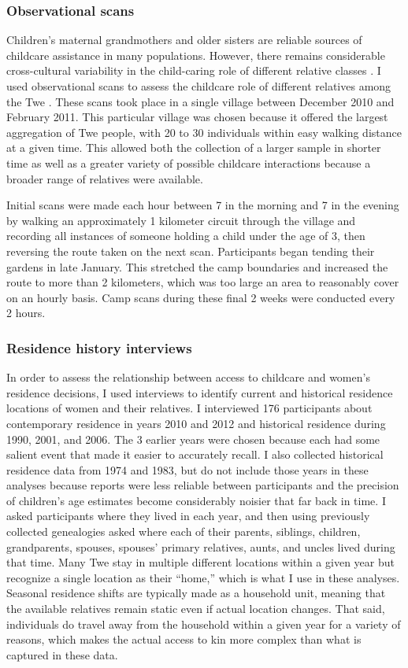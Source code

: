 \documentclass[10pt]{article}
\begin{document}
\subsubsection{Observational scans} 
Children's maternal grandmothers and older sisters are reliable sources of childcare assistance in many populations.  However, there remains considerable cross-cultural variability in the child-caring role of different relative classes \citep{hames2004women, kramer2010cooperative}.  I used observational scans to assess the childcare role of different relatives among the Twe \citep{crittenden2008allomaternal}.  These scans took place in a single village between December 2010 and February 2011.  This particular village was chosen because it offered the largest aggregation of Twe people, with 20 to 30 individuals within easy walking distance at a given time.  This allowed both the collection of a larger sample in shorter time as well as a greater variety of possible childcare interactions because a broader range of relatives were available.

Initial scans were made each hour between 7 in the morning and 7 in the evening by walking an approximately 1 kilometer circuit through the village and recording all instances of someone holding a child under the age of 3, then reversing the route taken on the next scan.  Participants began tending their gardens in late January.  This stretched the camp boundaries and increased the route to more than 2 kilometers, which was too large an area to reasonably cover on an hourly basis.  Camp scans during these final 2 weeks were conducted every 2 hours.

\subsubsection{Residence history interviews}  
In order to assess the relationship between access to childcare and women's residence decisions, I used interviews to identify current and historical residence locations of women and their relatives.  I interviewed 176 participants about contemporary residence in years 2010 and 2012 and historical residence during 1990, 2001, and 2006.  The 3 earlier years were chosen because each had some salient event that made it easier to accurately recall.  I also collected historical residence data from 1974 and 1983, but do not include those years in these analyses because reports were less reliable between participants and the precision of children's age estimates become considerably noisier that far back in time.  I asked participants where they lived in each year, and then using previously collected genealogies asked where each of their parents, siblings, children, grandparents, spouses, spouses' primary relatives, aunts, and uncles lived during that time.  Many Twe stay in multiple different locations within a given year but recognize a single location as their ``home,'' which is what I use in these analyses.  Seasonal residence shifts are typically made as a household unit, meaning that the available relatives remain static even if actual location changes.  That said, individuals do travel away from the household within a given year for a variety of reasons, which makes the actual access to kin more complex than what is captured in these data.
\end{document}
